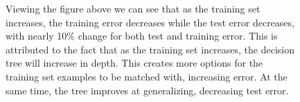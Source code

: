 \documentclass[11pt]{article}
\begin{document}
\begin{enumerate}
{\begin{figure}[!htbp]
    \caption{Viewing the figure above we can see that as the training set increases, the training error decreases while the test error decreases, with nearly 10\% change for both test and training error. This is attributed to the fact that as the training set increases, the decision tree will increase in depth. This creates more options for the training set examples to be matched with, increasing error. At the same time, the tree improves at generalizing, decreasing test error.}
\end{figure}
\vspace{1cm}
}
\end{enumerate}
\end{document}
